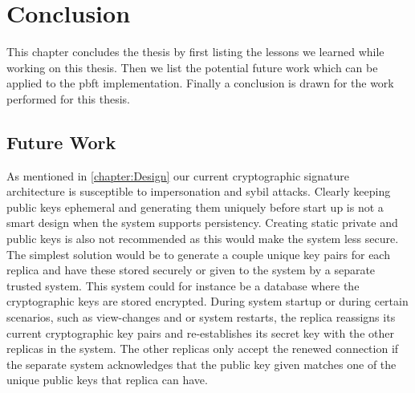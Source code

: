 \chapter{Conclusion}
\label{chapter:Con}
This chapter concludes the thesis by first listing the lessons we learned while working on this thesis. Then we list the potential future work which can be applied to the \ac{pbft} implementation.
Finally a conclusion is drawn for the work performed for this thesis.



\section{Future Work}

As mentioned in \autoref{chapter:Design} our current cryptographic signature architecture is susceptible to impersonation and sybil attacks. Clearly keeping public keys ephemeral and generating them uniquely before start up is not a smart design when the system supports persistency. Creating static private and public keys is also not recommended as this would make the system less secure. The simplest solution would be to generate a couple unique key pairs for each replica and have these stored securely or given to the system by a separate trusted system. This system could for instance be a database where the cryptographic keys are stored encrypted. During system startup or during certain scenarios, such as view-changes and or system restarts, the replica reassigns its current cryptographic key pairs and re-establishes its secret key with the other replicas in the system. The other replicas only accept the renewed connection if the separate system acknowledges that the public key given matches one of the unique public keys that replica can have.

